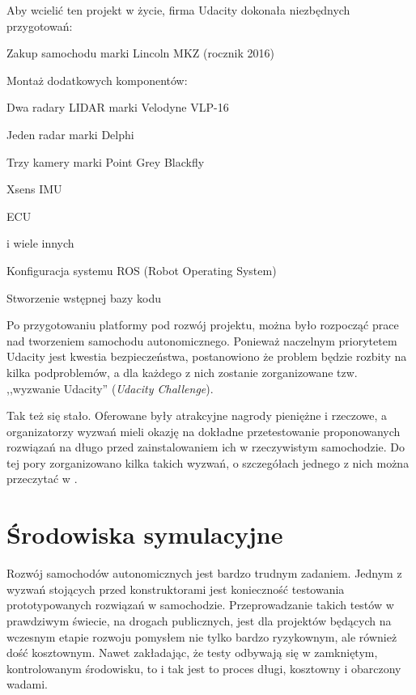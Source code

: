 Aby wcielić ten projekt w życie, firma Udacity dokonała niezbędnych przygotowań:
\begin{enumerate*}
\item Zakup samochodu marki Lincoln MKZ (rocznik 2016)
\item Montaż dodatkowych komponentów:
\begin{itemize*}
\item Dwa radary LIDAR marki Velodyne VLP-16
\item Jeden radar marki Delphi
\item Trzy kamery marki Point Grey Blackfly
\item Xsens IMU \cite{imu:wikipedia}
\item ECU \cite{ecu:wikipedia}
\item i wiele innych
\end{itemize*}
\item Konfiguracja systemu ROS (Robot Operating System) \cite{ros:about}
\item Stworzenie wstępnej bazy kodu
\end{enumerate*}

Po przygotowaniu platformy pod rozwój projektu, można było rozpocząć prace nad tworzeniem samochodu autonomicznego. Ponieważ naczelnym priorytetem Udacity jest kwestia bezpieczeństwa, postanowiono że problem będzie rozbity na kilka podproblemów, a dla każdego z nich zostanie zorganizowane tzw. ,,wyzwanie Udacity'' (\textit{Udacity Challenge}).

Tak też się stało. Oferowane były atrakcyjne nagrody pieniężne i rzeczowe, a organizatorzy wyzwań mieli okazję na dokładne przetestowanie proponowanych rozwiązań na długo przed zainstalowaniem ich w rzeczywistym samochodzie. Do tej pory zorganizowano kilka takich wyzwań, o szczegółach jednego z nich można przeczytać w \cite{udacity:challenge2}.

\section{Środowiska symulacyjne}
\label{SimulationEnvs}
\vspace{0.5cm}
Rozwój samochodów autonomicznych jest bardzo trudnym zadaniem. Jednym z wyzwań stojących przed konstruktorami jest konieczność testowania prototypowanych rozwiązań w samochodzie. Przeprowadzanie takich testów w prawdziwym świecie, na drogach publicznych, jest dla projektów będących na wczesnym etapie rozwoju pomysłem nie tylko bardzo ryzykownym, ale również dość kosztownym. Nawet zakładając, że testy odbywają się w zamkniętym, kontrolowanym środowisku, to i tak jest to proces długi, kosztowny i obarczony wadami.

